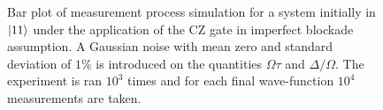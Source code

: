 \documentclass[rmp,10pt,onecolumn,fleqn,notitlepage]{revtex4-1}
\begin{document}
\begin{figure}[H]
\begin{minipage}[c]{0.49\linewidth}
\end{minipage}
\begin{minipage}[]{0.49\linewidth}
\centering
{}
\end{minipage}
\caption{Bar plot of measurement process simulation for a system initially in $\left\vert{11}\right\rangle$ under the application of the CZ gate in imperfect blockade assumption. A Gaussian noise with mean zero and standard deviation of $1\%$ is introduced on the quantities $\Omega\tau$ and $\Delta/\Omega$. The experiment is ran $10^3$ times and for each final wave-function $10^4$ measurements are taken.}
\label{fig:measurement_imperfect-blockade}
\end{figure}
\end{document}

